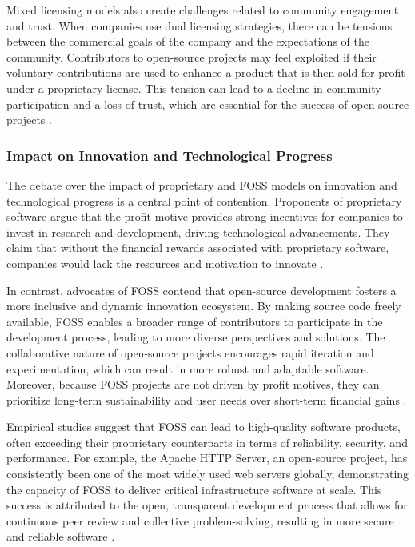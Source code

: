 \begin{refsection}
Mixed licensing models also create challenges related to community engagement and trust. When companies use dual licensing strategies, there can be tensions between the commercial goals of the company and the expectations of the community. Contributors to open-source projects may feel exploited if their voluntary contributions are used to enhance a product that is then sold for profit under a proprietary license. This tension can lead to a decline in community participation and a loss of trust, which are essential for the success of open-source projects \cite[pp.~89-95]{benkler2010}.

\subsubsection{Impact on Innovation and Technological Progress}

The debate over the impact of proprietary and FOSS models on innovation and technological progress is a central point of contention. Proponents of proprietary software argue that the profit motive provides strong incentives for companies to invest in research and development, driving technological advancements. They claim that without the financial rewards associated with proprietary software, companies would lack the resources and motivation to innovate \cite[pp.~140-145]{weber2005}.

In contrast, advocates of FOSS contend that open-source development fosters a more inclusive and dynamic innovation ecosystem. By making source code freely available, FOSS enables a broader range of contributors to participate in the development process, leading to more diverse perspectives and solutions. The collaborative nature of open-source projects encourages rapid iteration and experimentation, which can result in more robust and adaptable software. Moreover, because FOSS projects are not driven by profit motives, they can prioritize long-term sustainability and user needs over short-term financial gains \cite[pp.~78-84]{lerner2000}.

Empirical studies suggest that FOSS can lead to high-quality software products, often exceeding their proprietary counterparts in terms of reliability, security, and performance. For example, the Apache HTTP Server, an open-source project, has consistently been one of the most widely used web servers globally, demonstrating the capacity of FOSS to deliver critical infrastructure software at scale. This success is attributed to the open, transparent development process that allows for continuous peer review and collective problem-solving, resulting in more secure and reliable software \cite[pp.~60-67]{raymond2022}.


\end{refsection}

